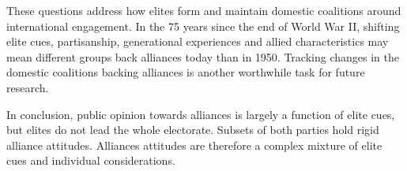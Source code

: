 \documentclass[12pt]{article}
\begin{document}
These questions address how elites form and maintain domestic coalitions around international engagement. 
In the 75 years since the end of World War II, shifting elite cues, partisanship, generational experiences and allied characteristics may mean different groups back alliances today than in 1950. 
Tracking changes in the domestic coalitions backing alliances is another worthwhile task for future research.


In conclusion, public opinion towards alliances is largely a function of elite cues, but elites do not lead the whole electorate.  
Subsets of both parties hold rigid alliance attitudes. 
Alliances attitudes are therefore a complex mixture of elite cues and individual considerations. 



\newpage

 
 
\end{document}
